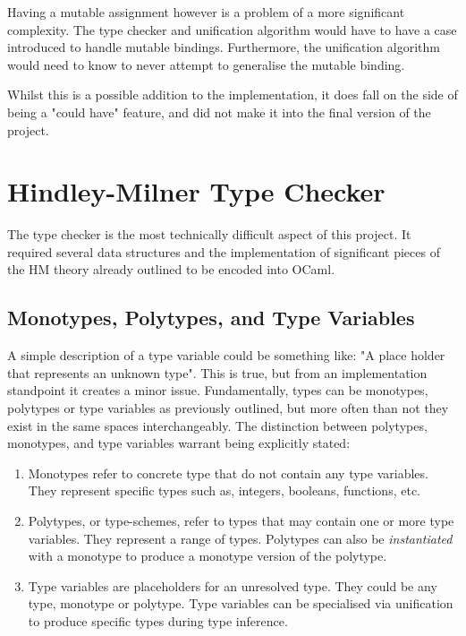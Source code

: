 \documentclass{l4proj}
\begin{document}
Having a mutable assignment however is a problem of a more significant complexity.
The type checker and unification algorithm would have to have a case introduced to handle mutable bindings.
Furthermore, the unification algorithm would need to know to never attempt to generalise the mutable binding.

Whilst this is a possible addition to the implementation, it does fall on the side of being a "could have" feature, and did not make it into the final version of the project.



\section{Hindley-Milner Type Checker} \label{sec:hindley-milner-typechecker}

The type checker is the most technically difficult aspect of this project.
It required several data structures and the implementation of significant pieces of the HM theory already outlined to be encoded into OCaml.

\subsection{Monotypes, Polytypes, and Type Variables}

A simple description of a type variable could be something like: "A place holder that represents an unknown type".
This is true, but from an implementation standpoint it creates a minor issue.
Fundamentally, types can be monotypes, polytypes or type variables as previously outlined, but more often than not they exist in the same spaces interchangeably.
The distinction between polytypes, monotypes, and type variables warrant being explicitly stated:

\begin{enumerate}
    \item Monotypes refer to concrete type that do not contain any type variables.
    They represent specific types such as, integers, booleans, functions, etc.

    \item Polytypes, or type-schemes, refer to types that may contain one or more type variables.
    They represent a range of types.
    Polytypes can also be \emph{instantiated} with a monotype to produce a monotype version of the polytype.

    \item Type variables are placeholders for an unresolved type.
    They could be any type, monotype or polytype.
    Type variables can be specialised via unification to produce specific types during type inference.
\end{enumerate}
\end{document}
